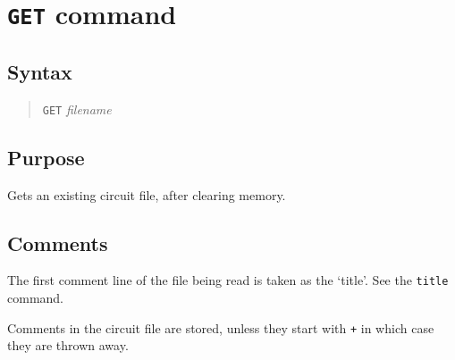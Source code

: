 %
%
%
%
\section{{\tt GET} command}
\subsection{Syntax}
\begin{verse}
{\tt GET} {\it filename}
\end{verse}
\subsection{Purpose}

Gets an existing circuit file, after clearing memory.
\subsection{Comments}

The first comment line of the file being read is taken as the `title'.  See
the {\tt title} command.

Comments in the circuit file are stored, unless they start with {\tt *+} in
which case they are thrown away.

